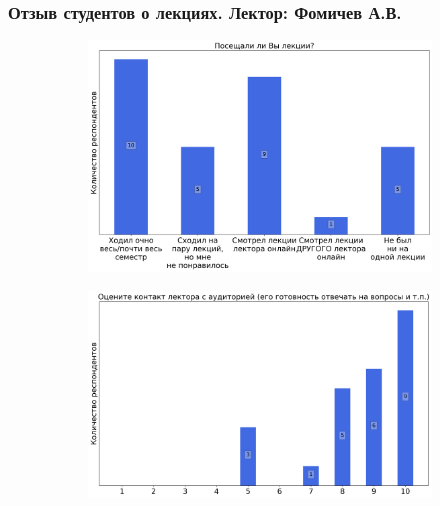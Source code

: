 	\subsubsection{Отзыв студентов о лекциях. Лектор: Фомичев А.В.}

		\begin{figure}[H]
			\centering
            \begin{subfigure}[b]{0.45\textwidth}
				\centering
				\includegraphics[width=\textwidth]{images/2 course/Аналитическая механика/lecturer-questions-Фомичев А.В.-0.png}
			\end{subfigure}
			\begin{subfigure}[b]{0.45\textwidth}
				\centering
				\includegraphics[width=\textwidth]{images/2 course/Аналитическая механика/lecturer-marks-Фомичев А.В.-0.png}
			\end{subfigure}
			\begin{subfigure}[b]{0.45\textwidth}
				\centering

\end{subfigure}
\end{figure}
